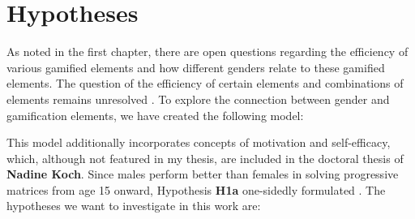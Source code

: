 \section{Hypotheses}

As noted in the first chapter, there are open questions regarding the efficiency of various gamified elements and how different genders relate to these gamified elements.
The question of the efficiency of certain elements and combinations of elements remains unresolved \parencite{dehghanzadehUsingGamificationSupport2024}.
To explore the connection between gender and gamification elements, we have created the following model:\newline

\newline
This model additionally incorporates concepts of motivation and self-efficacy, which, although not featured in my thesis, are included in the doctoral thesis of \textbf{Nadine Koch}.\newline
Since males perform better than females in solving progressive matrices from age 15 onward, Hypothesis \textbf{H1a} one-sidedly formulated \parencite{ravenStandardProgressiveMatrices2003}.
The hypotheses we want to investigate in this work are:
